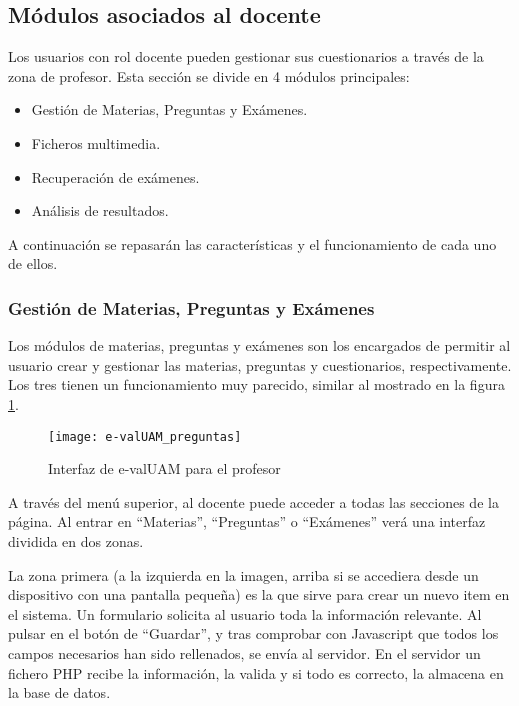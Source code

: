 \subsection{Módulos asociados al docente}

Los usuarios con rol docente pueden gestionar sus cuestionarios a través de la zona de profesor. Esta sección se divide en 4 módulos principales:

\begin{itemize}
	\item Gestión de Materias, Preguntas y Exámenes.
	\item Ficheros multimedia.
	\item Recuperación de exámenes.
	\item Análisis de resultados.
\end{itemize}

A continuación se repasarán las características y el funcionamiento de cada uno de ellos.

\subsubsection{Gestión de Materias, Preguntas y Exámenes}

Los módulos de materias, preguntas y exámenes son los encargados de permitir al usuario crear y gestionar las materias, preguntas y cuestionarios, respectivamente. Los tres tienen un funcionamiento muy parecido, similar al mostrado en la figura \ref{fig:e-valUAM interfaz profesor}.

\begin{figure}[htp!]
	\centering
	\texttt{[image: e-valUAM\_preguntas]}
	\caption{Interfaz de e-valUAM para el profesor}
	\label{fig:e-valUAM interfaz profesor}
\end{figure}

A través del menú superior, al docente puede acceder a todas las secciones de la página. Al entrar en ``Materias'', ``Preguntas'' o ``Exámenes'' verá una interfaz dividida en dos zonas. 

La zona primera (a la izquierda en la imagen, arriba si se accediera desde un dispositivo con una pantalla pequeña) es la que sirve para crear un nuevo item en el sistema. Un formulario solicita al usuario toda la información relevante. Al pulsar en el botón de ``Guardar'', y tras comprobar con Javascript que todos los campos necesarios han sido rellenados, se envía al servidor. En el servidor un fichero PHP recibe la información, la valida y si todo es correcto, la almacena en la base de datos.


